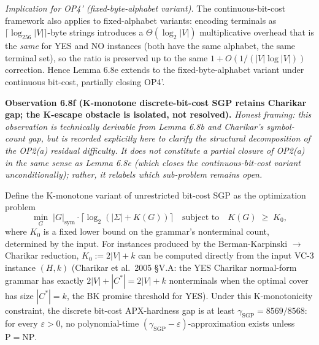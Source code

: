 \documentclass[
]{article}
\begin{document}
\emph{Implication for OP4' (fixed-byte-alphabet variant).} The
continuous-bit-cost framework also applies to fixed-alphabet variants:
encoding terminals as $\lceil \log_{256} |V| \rceil$-byte strings
introduces a $\Theta(\log_2 |V|)$ multiplicative overhead that is the
\emph{same} for YES and NO instances (both have the same alphabet,
the same terminal set), so the ratio is preserved up to the same
$1 + O(1/(|V| \log |V|))$ correction. Hence Lemma 6.8e extends to
the fixed-byte-alphabet variant under continuous bit-cost,
partially closing OP4'.

\textbf{Observation 6.8f (K-monotone discrete-bit-cost SGP retains
Charikar gap; the K-escape obstacle is isolated, not resolved).}
\emph{Honest framing: this observation is technically derivable from
Lemma 6.8b and Charikar's symbol-count gap, but is recorded
explicitly here to clarify the structural decomposition of the
OP2(a) residual difficulty. It does \emph{not} constitute a partial
closure of OP2(a) in the same sense as Lemma 6.8e (which closes
the continuous-bit-cost variant unconditionally); rather, it
relabels which sub-problem remains open.}

Define the K-monotone variant of unrestricted bit-cost SGP as the
optimization problem
\[
\min_{G} \;|G|_{\mathrm{sym}} \cdot \lceil \log_2(|\Sigma| + K(G)) \rceil
\quad \text{subject to} \quad K(G) \;\geq\; K_0,
\]
where $K_0$ is a fixed lower bound on the grammar's nonterminal
count, determined by the input. For instances produced by the
Berman-Karpinski $\to$ Charikar reduction, $K_0 := 2|V| + k$ can
be computed directly from the input VC-3 instance $(H, k)$
(Charikar et al.\ 2005 §V.A: the YES Charikar normal-form grammar
has exactly $2|V| + |C^*| = 2|V| + k$ nonterminals when the
optimal cover has size $|C^*| = k$, the BK promise threshold for
YES). Under this K-monotonicity constraint, the discrete bit-cost
APX-hardness gap is at least $\gamma_{\mathrm{SGP}} = 8569/8568$:
for every $\varepsilon > 0$, no polynomial-time
$(\gamma_{\mathrm{SGP}} - \varepsilon)$-approximation exists unless
$\mathrm{P} = \mathrm{NP}$.
\end{document}
